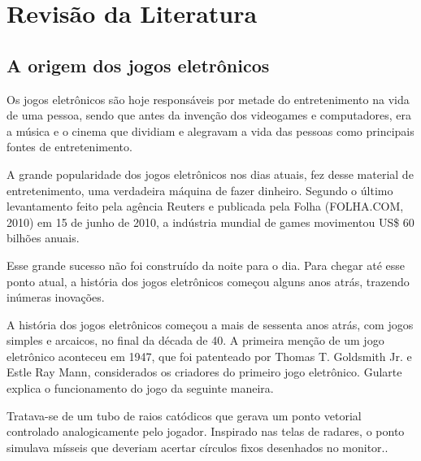 

\chapter{Revisão da Literatura}

\section{A origem dos jogos eletrônicos}

Os jogos eletrônicos são hoje responsáveis por metade do entretenimento na vida de uma pessoa, sendo que antes da invenção dos videogames e computadores, era a música e o cinema que dividiam e alegravam a vida  das pessoas como principais fontes de entretenimento.

A grande popularidade dos jogos eletrônicos nos dias atuais, fez desse material de entretenimento, uma verdadeira máquina de fazer dinheiro. Segundo o último levantamento feito pela agência Reuters e publicada pela Folha (FOLHA.COM, 2010) em 15 de junho de 2010, a indústria mundial de games movimentou US\$ 60 bilhões anuais.
 
Esse grande sucesso não foi construído da noite para o dia. Para chegar até esse ponto atual, a história dos jogos eletrônicos começou alguns anos atrás, trazendo inúmeras inovações.

A história dos jogos eletrônicos começou a mais de sessenta anos atrás, com jogos simples e arcaicos, no final da década de 40. A primeira menção de um jogo eletrônico aconteceu em 1947, que foi patenteado por Thomas T. Goldsmith Jr. e Estle Ray Mann, considerados os criadores do primeiro jogo eletrônico. Gularte explica o funcionamento do jogo da seguinte maneira.

\begin{citacao}
Tratava-se de um tubo de raios catódicos que gerava um ponto vetorial controlado analogicamente pelo jogador. Inspirado nas telas de radares, o ponto simulava mísseis que deveriam acertar círculos fixos desenhados no monitor.\cite[p.~40]{Gularte}.
\end{citacao}


